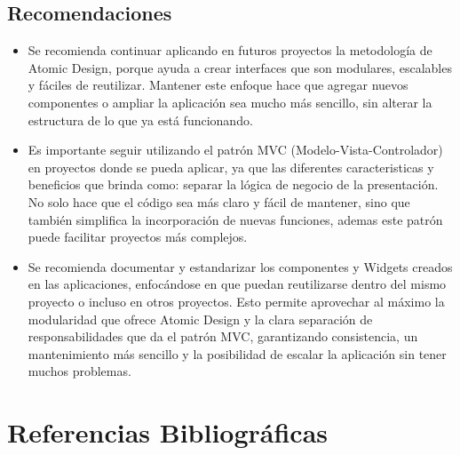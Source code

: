 \documentclass[12pt,letterpaper]{article}
\begin{document}
\subsection{Recomendaciones}

\begin{itemize}
    \item Se recomienda continuar aplicando en futuros proyectos la metodología de Atomic Design, porque ayuda a crear interfaces que son modulares, escalables y fáciles de reutilizar. Mantener este enfoque hace que agregar nuevos componentes o ampliar la aplicación sea mucho más sencillo, sin alterar la estructura de lo que ya está funcionando.
    
    \item Es importante seguir utilizando el patrón MVC (Modelo-Vista-Controlador) en proyectos donde se pueda aplicar, ya que las diferentes caracteristicas y beneficios que brinda como: separar la lógica de negocio de la presentación. No solo hace que el código sea más claro y fácil de mantener, sino que también simplifica la incorporación de nuevas funciones, ademas este patrón puede facilitar proyectos más complejos.
    
    \item Se recomienda documentar y estandarizar los componentes y Widgets creados en las aplicaciones, enfocándose en que puedan reutilizarse dentro del mismo proyecto o incluso en otros proyectos. Esto permite aprovechar al máximo la modularidad que ofrece Atomic Design y la clara separación de responsabilidades que da el patrón MVC, garantizando consistencia, un mantenimiento más sencillo y la posibilidad de escalar la aplicación sin tener muchos problemas.
\end{itemize}



\section{Referencias Bibliográficas}
\printbibliography[heading=none]

\end{document}
